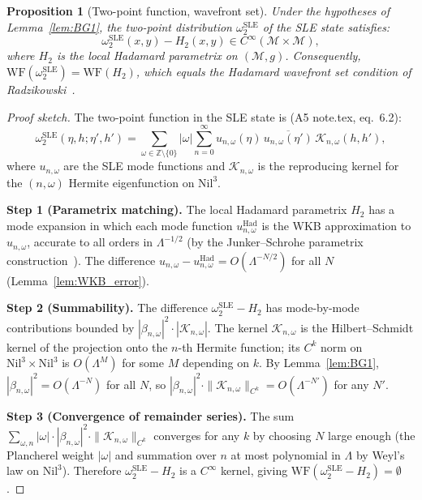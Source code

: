 \documentclass[11pt, a4paper]{article}
\newtheorem{proposition}[theorem]{Proposition}
\newcommand{\ZZ}{\mathbb{Z}}
\newcommand{\Nil}{\mathrm{Nil}^3}
\newcommand{\WF}{\mathrm{WF}}
\newcommand{\om}{\omega}
\newcommand{\Lam}{\Lambda}
\begin{document}
\begin{proposition}[Two-point function, wavefront set]\label{prop:WF_smooth}
  Under the hypotheses of Lemma~\ref{lem:BG1},
  the two-point distribution $\omega_2^{\mathrm{SLE}}$ of the SLE state
  satisfies:
  \begin{equation}
    \omega_2^{\mathrm{SLE}}(x,y) - H_2(x,y) \in C^\infty(\mathcal{M} \times \mathcal{M}),
  \end{equation}
  where $H_2$ is the local Hadamard parametrix on $(\mathcal{M}, g)$.
  Consequently, $\WF(\omega_2^{\mathrm{SLE}}) = \WF(H_2)$,
  which equals the Hadamard wavefront set condition of Radzikowski~\cite{Rad96}.
\end{proposition}

\begin{proof}[Proof sketch]
  The two-point function in the SLE state is (A5 note.tex, eq.~6.2):
  \begin{equation}\label{eq:2pt_BII}
    \omega_2^{\mathrm{SLE}}(\eta, h; \eta', h')
    = \sum_{\om \in \ZZ \setminus \{0\}} |\om| \sum_{n=0}^\infty
    u_{n,\om}(\eta)\,\overline{u_{n,\om}(\eta')}\,
    \mathcal{K}_{n,\om}(h, h'),
  \end{equation}
  where $u_{n,\om}$ are the SLE mode functions and
  $\mathcal{K}_{n,\om}$ is the reproducing kernel for the
  $(n,\om)$ Hermite eigenfunction on $\Nil$.

  \textbf{Step 1 (Parametrix matching).}
  The local Hadamard parametrix $H_2$ has a mode expansion in which
  each mode function $u^{\mathrm{Had}}_{n,\om}$ is the WKB approximation
  to $u_{n,\om}$, accurate to all orders in $\Lam^{-1/2}$
  (by the Junker--Schrohe parametrix construction~\cite{JS02}).
  The difference $u_{n,\om} - u^{\mathrm{Had}}_{n,\om} = O(\Lam^{-N/2})$
  for all $N$ (Lemma~\ref{lem:WKB_error}).

  \textbf{Step 2 (Summability).}
  The difference $\omega_2^{\mathrm{SLE}} - H_2$ has mode-by-mode
  contributions bounded by $|\beta_{n,\om}|^2 \cdot |\mathcal{K}_{n,\om}|$.
  The kernel $\mathcal{K}_{n,\om}$ is the Hilbert--Schmidt kernel
  of the projection onto the $n$-th Hermite function; its $C^k$ norm
  on $\Nil \times \Nil$ is $O(\Lam^M)$ for some $M$ depending on $k$.
  By Lemma~\ref{lem:BG1}, $|\beta_{n,\om}|^2 = O(\Lam^{-N})$ for all $N$,
  so $|\beta_{n,\om}|^2 \cdot \|\mathcal{K}_{n,\om}\|_{C^k} = O(\Lam^{-N'})$
  for any $N'$.

  \textbf{Step 3 (Convergence of remainder series).}
  The sum $\sum_{\om, n} |\om| \cdot |\beta_{n,\om}|^2 \cdot \|\mathcal{K}_{n,\om}\|_{C^k}$
  converges for any $k$ by choosing $N$ large enough
  (the Plancherel weight $|\om|$ and summation over $n$ at most polynomial in $\Lam$
  by Weyl's law on $\Nil$).
  Therefore $\omega_2^{\mathrm{SLE}} - H_2$ is a $C^\infty$ kernel,
  giving $\WF(\omega_2^{\mathrm{SLE}} - H_2) = \emptyset$.


\end{proof}
\end{document}
